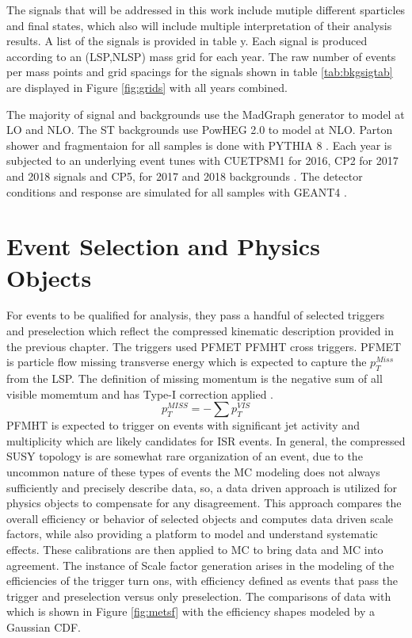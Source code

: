 The signals that will be addressed in this work include mutiple different sparticles and final states, which also will include multiple interpretation of their analysis results. A list of the signals is provided in table y. Each signal is produced according to an (LSP,NLSP) mass grid for each year.  The raw number of events per mass points and grid spacings for the signals shown in table \ref{tab:bkgsigtab} are displayed in Figure \ref{fig:grids} with all years combined. 


The majority of signal and backgrounds use the MadGraph \cite{Alwall:2011uj} generator to model at LO and NLO. The ST backgrounds use PowHEG 2.0 \cite{Alioli:2010xd} to model at NLO. Parton shower and fragmentaion for all samples is done with PYTHIA 8 \cite{Sjostrand:2014zea}. Each year is subjected to an underlying event tunes with CUETP8M1 for 2016, CP2 for 2017 and 2018 signals and CP5, for 2017 and 2018 backgrounds \cite{CMS:2015wcf}\cite{CMS:2019csb}. The detector conditions and response are simulated for all samples with GEANT4 \cite{GEANT4:2002zbu}.
 
\section{Event Selection and Physics Objects}
 For events to be qualified for analysis, they pass a handful of selected triggers and preselection which reflect the compressed kinematic description provided in the previous chapter. The triggers used PFMET PFMHT cross triggers. PFMET is particle flow missing transverse energy which is expected to capture the $p_T^{Miss}$ from the LSP. The definition of missing momentum is the negative sum of all visible momemtum and has Type-I correction applied \cite{CMS:2008oxa}. 
\begin{equation}
p_T^{MISS} = -\sum{p_T^{VIS}}
\end{equation} 
PFMHT is expected to trigger on events with significant jet activity and multiplicity which are likely candidates for ISR events.  In general, the compressed SUSY topology is are somewhat rare organization of an event, due to the uncommon nature of these types of events the MC modeling does not always sufficiently and precisely describe data, so,  a data driven approach is utilized for physics objects to compensate for any disagreement. This approach compares the overall efficiency or behavior of selected objects and computes data driven scale factors, while also providing a platform to model and understand systematic effects. These calibrations are then applied to MC to bring data and MC into agreement. The instance of Scale factor generation arises in the modeling of the efficiencies of the trigger turn ons, with efficiency defined as events that pass the trigger and preselection versus only preselection. The comparisons of data with  which is shown in Figure \ref{fig:metsf} with the efficiency shapes modeled by a Gaussian CDF.  

